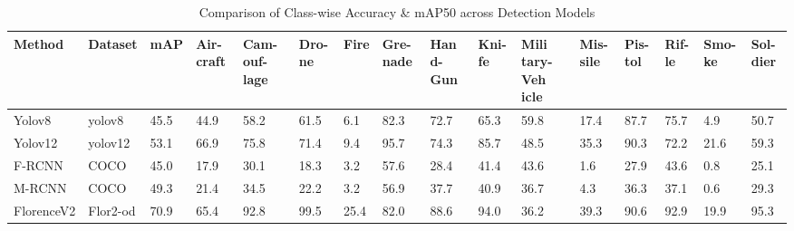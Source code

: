 \documentclass[fleqn,10pt,lineno]{wlpeerj}
\begin{document}
\begin{table}[H]
\centering
\scriptsize %
\caption{Comparison of Class-wise Accuracy \& mAP50 across Detection Models}
\renewcommand{\arraystretch}{1.2} %
\begin{tabular}{|p{1.2cm}|p{1cm}|p{0.7cm}|p{0.5cm}|p{0.5cm}|p{0.5cm}|p{0.5cm}|p{0.5cm}|p{0.5cm}|p{0.5cm}|p{0.5cm}|p{0.5cm}|p{0.5cm}|p{0.5cm}|p{0.5cm}|p{0.5cm}|}
\hline
\textbf{Method} & \textbf{Dataset} & \textbf{mAP} & \textbf{Air-craft\newline} & \textbf{Cam-ouf-lage\newline} & \textbf{Dro-ne\newline} & \textbf{Fire\newline} & \textbf{Gre-nade\newline} & \textbf{Han
d-Gun\newline} & \textbf{Kni-fe\newline} & \textbf{Mili
tary-\newline Veh
icle} & \textbf{Mis-sile\newline} & \textbf{Pis-tol\newline} & \textbf{Rif-le\newline} & \textbf{Smo-ke\newline} & \textbf{Sol-dier\newline} \\
\hline
Yolov8       & yolov8        & 45.5 & 44.9 & 58.2 & 61.5 & 6.1  & 82.3 & 72.7 & 65.3 & 59.8 & 17.4 & 87.7 & 75.7 & 4.9  & 50.7 \\
Yolov12      & yolov12       & 53.1 & 66.9 & 75.8 & 71.4 & 9.4  & 95.7 & 74.3 & 85.7 & 48.5 & 35.3 & 90.3 & 72.2 & 21.6 & 59.3 \\
F-RCNN       & COCO          & 45.0 & 17.9 & 30.1 & 18.3 & 3.2  & 57.6 & 28.4 & 41.4 & 43.6 & 1.6  & 27.9 & 43.6 & 0.8  & 25.1 \\
M-RCNN       & COCO          & 49.3 & 21.4 & 34.5 & 22.2 & 3.2  & 56.9 & 37.7 & 40.9 & 36.7 & 4.3  & 36.3 & 37.1 & 0.6  & 29.3 \\
Florence\newline V2 & Flor2-od & 70.9 & 65.4 & 92.8 & 99.5 & 25.4 & 82.0 & 88.6 & 94.0 & 36.2 & 39.3 & 90.6 & 92.9 & 19.9 & 95.3 \\
\hline
\end{tabular}
\label{tab:compact_model_comparison}
\end{table}
\end{document}
